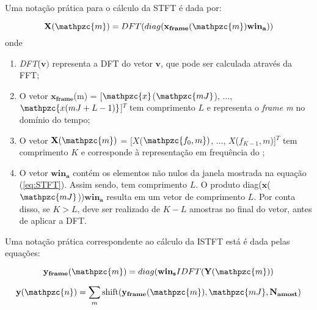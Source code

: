         Uma notação prática para o cálculo da STFT é dada por:


        \begin{equation}\label{eq:practiceSTFT}
            \mathbf{X}(\mathpzc{m})
            = DFT(diag(\mathbf{x_{frame}}(\mathpzc{m})\mathbf{win_a}))
         \end{equation}
         onde 
        \begin{enumerate}
        
            \item \textit{DFT}($\mathbf{v})$ representa a DFT do vetor $\mathbf{v}$, que pode ser calculada através da FFT;
            
            \item O vetor $\mathbf{x_{frame}}$(m) = [$\mathpzc{x}$($\mathpzc{mJ}$), $\dots$, $\mathpzc{x(mJ + L - 1)}$]$^T$ tem comprimento $L$ e representa o \textit{frame m} no domínio do tempo;
            
            \item O vetor $\mathbf{X}(\mathpzc{m})$ = [${X}$($\mathpzc{f_0,m})$, $\dots$, ${X}$(${f_{K-1},m}$)]$^T$ tem comprimento $K$ e corresponde à representação em
            frequência do ;
            
            \item O vetor $\mathbf{win_a}$ contém os elementos não nulos da janela mostrada na equação (\ref{eq:STFT}). Assim sendo, tem comprimento $L$. O produto diag($\mathbf{x}$($\mathpzc{mJ}$))$\mathbf{win_a}$ resulta em um vetor de comprimento $L$. Por conta disso, se $K>L$, deve ser realizado  de $K-L$ amostras no final do vetor, antes de aplicar a DFT.
        
        \end{enumerate}
        
        Uma notação prática correspondente ao cálculo da ISTFT está é dada pelas equações:
        
        \begin{equation}\label{eq:practiceISTFT}
            \mathbf{y_{frame}}(\mathpzc{m})
            = diag(\mathbf{win_s}IDFT(\mathbf{Y}(\mathpzc{m}))
         \end{equation}
        
        \begin{equation}\label{eq:practiceISTFT2}
            \mathbf{y}(\mathpzc{n})
            = \sum_{m}\text{shift}(\mathbf{y_{frame}}(\mathpzc{m}),\mathpzc{mJ},\mathbf{N_{amost}})
         \end{equation}
        
